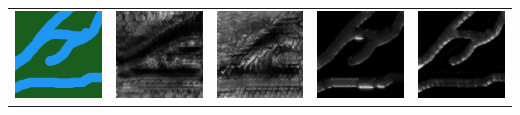 \documentclass[twocolumn]{article}
\begin{document}
\begin{table}[t]
\begin{tabular}{c|c|c|c|c}
 				\includegraphics[width=0.25\columnwidth]{40.png} & \includegraphics[width=0.25\columnwidth]{41.png} & \includegraphics[width=0.25\columnwidth]{42.png} & \includegraphics[width=0.25\columnwidth]{43.png} & \includegraphics[width=0.25\columnwidth]{44.png} \\

\end{tabular}
\end{table}
\end{document}
